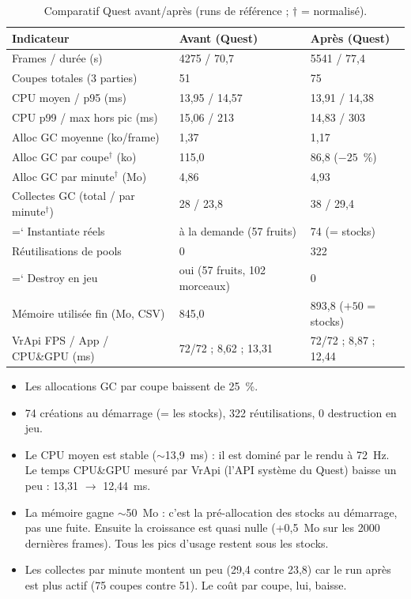 \documentclass[11pt,a4paper]{article}
\renewcommand{\texttt}[1]{%
  {\ttfamily\hyphenchar\font=`\/ \hyphenpenalty=50 \exhyphenpenalty=50 #1}}
\begin{document}
\begin{table}[H]
\centering\small
\caption{Comparatif Quest avant/après (runs de référence ; $\dagger$ = normalisé).}
\begin{tabularx}{\textwidth}{@{}L P{2.6cm} P{2.6cm}@{}}
\toprule
Indicateur & Avant (Quest) & Après (Quest) \\
\midrule
Frames / durée (s) & 4275 / 70,7 & 5541 / 77,4 \\
Coupes totales (3 parties) & 51 & 75 \\
CPU moyen / p95 (ms) & 13,95 / 14,57 & 13,91 / 14,38 \\
CPU p99 / max hors pic (ms) & 15,06 / 213 & 14,83 / 303 \\
Alloc GC moyenne (ko/frame) & 1,37 & 1,17 \\
Alloc GC par coupe$^\dagger$ (ko) & 115,0 & 86,8 ($-25$~\%) \\
Alloc GC par minute$^\dagger$ (Mo) & 4,86 & 4,93 \\
Collectes GC (total / par minute$^\dagger$) & 28 / 23,8 & 38 / 29,4 \\
\texttt{Instantiate} réels & à la demande (57 fruits) & 74 (= stocks) \\
Réutilisations de pools & 0 & 322 \\
\texttt{Destroy} en jeu & oui (57 fruits, 102 morceaux) & 0 \\
Mémoire utilisée fin (Mo, CSV) & 845,0 & 893,8 ($+50$ = stocks) \\
VrApi FPS / App / CPU\&GPU (ms) & 72/72 ; 8,62 ; 13,31 & 72/72 ; 8,87 ; 12,44 \\
\bottomrule
\end{tabularx}
\end{table}

\begin{itemize}
\item Les allocations GC par coupe baissent de 25~\%.
\item 74 créations au démarrage (= les stocks), 322 réutilisations, 0 destruction en jeu.
\item Le CPU moyen est stable ($\sim$13,9~ms) : il est dominé par le rendu à 72~Hz.
      Le temps CPU\&GPU mesuré par VrApi (l'API système du Quest) baisse un peu :
      13,31 $\rightarrow$ 12,44~ms.
\item La mémoire gagne $\sim$50~Mo : c'est la pré-allocation des stocks au démarrage,
      pas une fuite. Ensuite la croissance est quasi nulle (+0,5~Mo sur les 2000
      dernières frames). Tous les pics d'usage restent sous les stocks.
\item Les collectes par minute montent un peu (29,4 contre 23,8) car le run après est
      plus actif (75 coupes contre 51). Le coût par coupe, lui, baisse.
\end{itemize}
\end{document}
